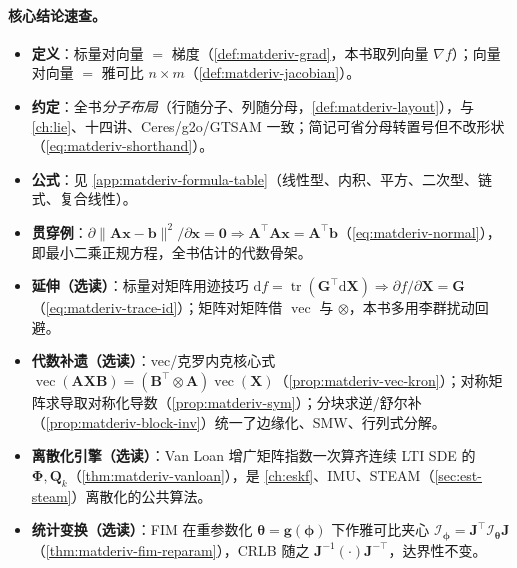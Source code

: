 \paragraph{核心结论速查。}
\begin{itemize}
  \item \textbf{定义}：标量对向量 $=$ 梯度（\cref{def:matderiv-grad}，本书取列向量 $\nabla f$）；向量对向量 $=$ 雅可比 $n\times m$（\cref{def:matderiv-jacobian}）。
  \item \textbf{约定}：全书\emph{分子布局}（行随分子、列随分母，\cref{def:matderiv-layout}），与 \cref{ch:lie}、十四讲、Ceres/g2o/GTSAM 一致；简记可省分母转置号但不改形状（\cref{eq:matderiv-shorthand}）。
  \item \textbf{公式}：见 \cref{app:matderiv-formula-table}（线性型、内积、平方、二次型、链式、复合线性）。
  \item \textbf{贯穿例}：$\partial\|\mathbf{A}\mathbf{x}-\mathbf{b}\|^2/\partial\mathbf{x}=\mathbf{0}\Rightarrow\mathbf{A}^\top\mathbf{A}\mathbf{x}=\mathbf{A}^\top\mathbf{b}$（\cref{eq:matderiv-normal}），即最小二乘正规方程，全书估计的代数骨架。
  \item \textbf{延伸（选读）}：标量对矩阵用迹技巧 $\mathrm{d}f=\operatorname{tr}(\mathbf{G}^\top\mathrm{d}\mathbf{X})\Rightarrow\partial f/\partial\mathbf{X}=\mathbf{G}$（\cref{eq:matderiv-trace-id}）；矩阵对矩阵借 $\operatorname{vec}$ 与 $\otimes$，本书多用李群扰动回避。
  \item \textbf{代数补遗（选读）}：vec/克罗内克核心式 $\operatorname{vec}(\mathbf{A}\mathbf{X}\mathbf{B})=(\mathbf{B}^\top\otimes\mathbf{A})\operatorname{vec}(\mathbf{X})$（\cref{prop:matderiv-vec-kron}）；对称矩阵求导取对称化导数（\cref{prop:matderiv-sym}）；分块求逆/舒尔补（\cref{prop:matderiv-block-inv}）统一了边缘化、SMW、行列式分解。
  \item \textbf{离散化引擎（选读）}：Van Loan 增广矩阵指数一次算齐连续 LTI SDE 的 $\boldsymbol{\Phi},\mathbf{Q}_k$（\cref{thm:matderiv-vanloan}），是 \cref{ch:eskf}、IMU、STEAM（\cref{sec:est-steam}）离散化的公共算法。
  \item \textbf{统计变换（选读）}：FIM 在重参数化 $\boldsymbol{\theta}=\mathbf{g}(\boldsymbol{\phi})$ 下作雅可比夹心 $\boldsymbol{\mathcal{I}}_{\boldsymbol{\phi}}=\mathbf{J}^\top\boldsymbol{\mathcal{I}}_{\boldsymbol{\theta}}\mathbf{J}$（\cref{thm:matderiv-fim-reparam}），CRLB 随之 $\mathbf{J}^{-1}(\cdot)\mathbf{J}^{-\top}$，达界性不变。
\end{itemize}


